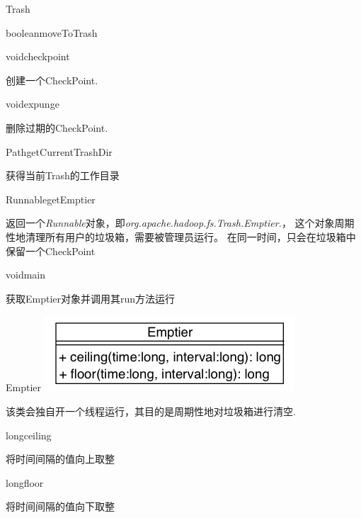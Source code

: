 \begin{XeClass}{Trash}
\begin{XeMethod}{\XePublic}{boolean}{moveToTrash}
    \end{XeMethod}

    \begin{XeMethod}{\XePublic}{void}{checkpoint}
         
 创建一个CheckPoint.

    \end{XeMethod}

    \begin{XeMethod}{\XePublic}{void}{expunge}
         
 删除过期的CheckPoint.

    \end{XeMethod}

    \begin{XeMethod}{}{Path}{getCurrentTrashDir}
         
 获得当前Trash的工作目录

    \end{XeMethod}

    \begin{XeMethod}{\XePublic}{Runnable}{getEmptier}
         
 返回一个\emph{Runnable}对象，即\emph{org.apache.hadoop.fs.Trash.Emptier.}，
 这个对象周期性地清理所有用户的垃圾箱，需要被管理员运行。
 在同一时间，只会在垃圾箱中保留一个CheckPoint

    \end{XeMethod}

    \begin{XeMethod}{\XePublic}{void}{main}
         
 获取Emptier对象并调用其run方法运行

    \end{XeMethod}

    \begin{XeInnerClass}{Emptier}
\includegraphics[width=\textwidth]{cdig/Emptier.png}
         
 该类会独自开一个线程运行，其目的是周期性地对垃圾箱进行清空.

        \begin{XeMethod}{\XePrivate}{long}{ceiling}
             
 将时间间隔的值向上取整

        \end{XeMethod}

        \begin{XeMethod}{\XePrivate}{long}{floor}
             
 将时间间隔的值向下取整

        \end{XeMethod}

    \end{XeInnerClass}
\end{XeClass}
